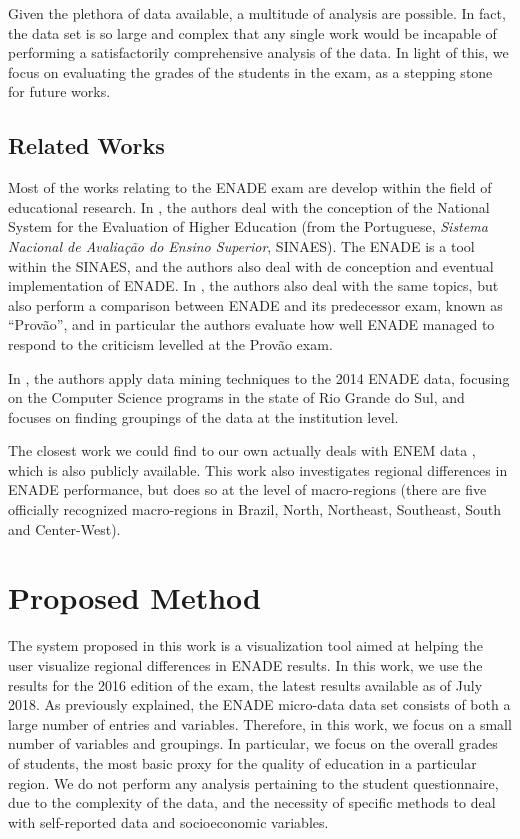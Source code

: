 \documentclass{vgtc}                          %
\begin{document}
Given the plethora of data available, a multitude of analysis are possible. In fact, the data set is so large and complex that any single work would be incapable of performing a satisfactorily comprehensive analysis of the data. In light of this, we focus on evaluating the grades of the students in the exam, as a stepping stone for future works.

\subsection{Related Works}

Most of the works relating to the ENADE exam are develop within the field of educational research. In \cite{brito2008sinaes}, the authors deal with the conception of the National System for the Evaluation of Higher Education (from the Portuguese, \emph{Sistema Nacional de Avaliação do Ensino Superior}, SINAES). The ENADE is a tool within the SINAES, and the authors also deal with de conception and eventual implementation of ENADE. In \cite{verhine2006provao}, the authors also deal with the same topics, but also perform a comparison between ENADE and its predecessor exam, known as ``Provão'', and in particular the authors evaluate how well ENADE managed to respond to the criticism levelled at the Provão exam.

In \cite{vista2017tecnicas}, the authors apply data mining techniques to the 2014 ENADE data, focusing on the Computer Science programs in the state of Rio Grande do Sul, and focuses on finding groupings of the data at the institution level.

The closest work we could find to our own actually deals with ENEM data \cite{viggiano2013desempenho}, which is also publicly available. This work also investigates regional differences in ENADE performance, but does so at the level of macro-regions (there are five officially recognized macro-regions in Brazil, North, Northeast, Southeast, South and Center-West). 

\section{Proposed Method}

The system proposed in this work is a visualization tool aimed at helping the user visualize regional differences in ENADE results. In this work, we use the results for the 2016 edition of the exam, the latest results available as of July 2018. As previously explained, the ENADE micro-data data set consists of both a large number of entries and variables. Therefore, in this work, we focus on a small number of variables and groupings. In particular, we focus on the overall grades of students, the most basic proxy for the quality of education in a particular region. We do not perform any analysis pertaining to the student questionnaire, due to the complexity of the data, and the necessity of specific methods to deal with self-reported data and socioeconomic variables.
\end{document}
